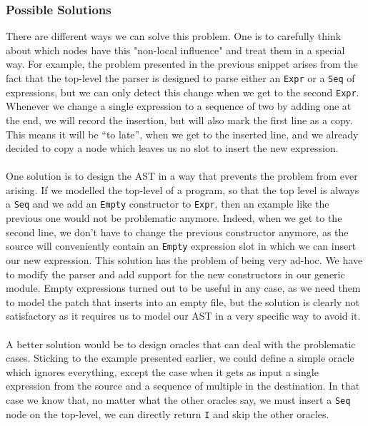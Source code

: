 \documentclass[11pt, titlepage]{article}
\newcommand{\toHaskell}[1]{\texttt{#1}\xspace}
\begin{document}
\subsubsection*{Possible Solutions}
There are different ways we can solve this problem. 
One is to carefully think about which nodes have this "non-local influence" and treat them in a special way. 
For example, the problem presented in the previous snippet arises from the fact that the top-level the parser is designed to parse either an \texttt{Expr} or a \texttt{Seq} of expressions, but we can only detect this change when we get to the second \toHaskell{Expr}. 
\\
Whenever we change a single expression to a sequence of two by adding one at the end, we will record the insertion, but will also mark the first line as a copy. This means it will be ``to late'', when we get to the inserted line, and we already decided to copy a node which leaves us no slot to insert the new expression.
\\
\\
One solution is to design the AST in a way that prevents the problem from ever arising. If we modelled the top-level of a program, so that the top level is always a \texttt{Seq} and we add an \texttt{Empty} constructor to \texttt{Expr}, then an example like the previous one would not be problematic anymore. 
Indeed, when we get to the second line, we don't have to change the previous constructor anymore, as the source will conveniently contain an \texttt{Empty} expression slot in which we can insert our new expression.
This solution has the problem of being very ad-hoc. We have to modify the parser and add support for the new constructors in our generic module. Empty expressions turned out to be useful in any case, as we need them to model the patch that inserts into an empty file, but the solution is clearly not satisfactory as it requires us to model our AST in a very specific way to avoid it.
\\
\\
A better solution would be to design oracles that can deal with the problematic cases. 
Sticking to the example presented earlier, we could define a simple oracle which ignores everything, except the case when it gets as input a single expression from the source and a sequence of multiple in the destination. In that case we know that, no matter what the other oracles say, we must insert a \texttt{Seq} node on the top-level, we can directly return \texttt{I} and skip the other oracles. 
\end{document}
